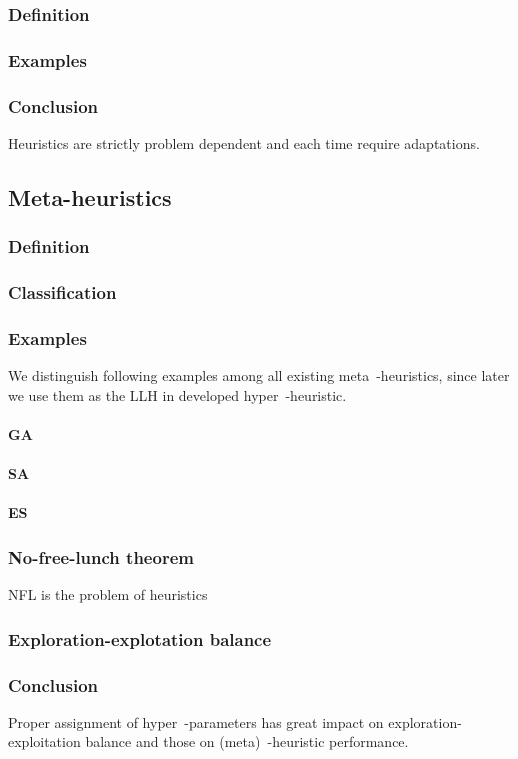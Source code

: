 \subsubsection{Definition}
\subsubsection{Examples}
\subsubsection{Conclusion}
Heuristics are strictly problem dependent and each time require adaptations.

\subsection{Meta-heuristics}
\subsubsection{Definition}
\subsubsection{Classification}
\subsubsection{Examples}
We distinguish following examples among all existing meta~-heuristics, since later we use them as the LLH in developed hyper~-heuristic.
\paragraph{GA}
\paragraph{SA}
\paragraph{ES}
\subsubsection{No-free-lunch theorem}
NFL is the problem of heuristics\cite{wolpert1997no}
\subsubsection{Exploration-explotation balance}
\subsubsection{Conclusion} 
Proper assignment of hyper~-parameters has great impact on exploration-exploitation balance and those on (meta)~-heuristic performance. 

